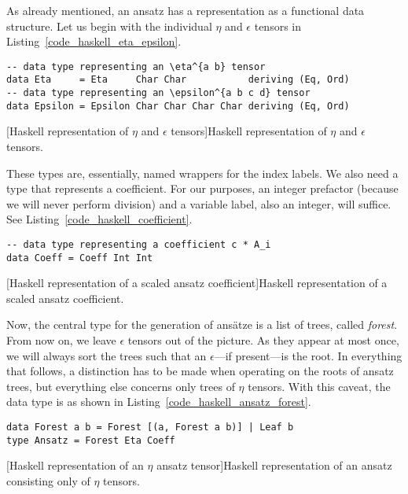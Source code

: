 As already mentioned, an ansatz has a representation as a functional data structure. Let us begin with the individual $\eta$ and $\epsilon$ tensors in Listing~\ref{code_haskell_eta_epsilon}.
\begin{code}
  \begin{verbatim}
-- data type representing an \eta^{a b} tensor
data Eta     = Eta     Char Char           deriving (Eq, Ord)
-- data type representing an \epsilon^{a b c d} tensor
data Epsilon = Epsilon Char Char Char Char deriving (Eq, Ord)
  \end{verbatim}
  [Haskell representation of $\eta$ and $\epsilon$ tensors]{Haskell representation of $\eta$ and $\epsilon$ tensors.}
  \label{code_haskell_eta_epsilon}
\end{code}
These types are, essentially, named wrappers for the index labels. We also need a type that represents a coefficient. For our purposes, an integer prefactor (because we will never perform division) and a variable label, also an integer, will suffice. See Listing~\ref{code_haskell_coefficient}.
\begin{code}
  \begin{verbatim}
-- data type representing a coefficient c * A_i
data Coeff = Coeff Int Int
  \end{verbatim}
  [Haskell representation of a scaled ansatz coefficient]{Haskell representation of a scaled ansatz coefficient.}
  \label{code_haskell_coefficient}
\end{code}
Now, the central type for the generation of ansätze is a list of trees, called \emph{forest}. From now on, we leave $\epsilon$ tensors out of the picture. As they appear at most once, we will always sort the trees such that an $\epsilon$---if present---is the root. In everything that follows, a distinction has to be made when operating on the roots of ansatz trees, but everything else concerns only trees of $\eta$ tensors. With this caveat, the data type is as shown in Listing~\ref{code_haskell_ansatz_forest}.
\begin{code}
  \begin{verbatim}
data Forest a b = Forest [(a, Forest a b)] | Leaf b
type Ansatz = Forest Eta Coeff
  \end{verbatim}
  [Haskell representation of an $\eta$ ansatz tensor]{Haskell representation of an ansatz consisting only of $\eta$ tensors.}
  \label{code_haskell_ansatz_forest}
\end{code}
